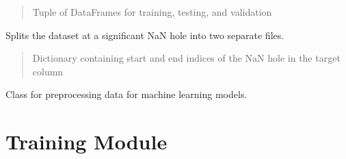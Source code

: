 \documentclass[letterpaper,10pt,english]{sphinxmanual}
\begin{document}
\begin{fulllineitems}
\begin{fulllineitems}
\begin{quote}
\begin{description}
\sphinxAtStartPar
Tuple of DataFrames for training, testing, and validation

\end{description}\end{quote}

\end{fulllineitems}


\begin{fulllineitems}
\label{\detokenize{docs/data_preprocessing:data_preprocessing.DataPreprocessor.split_file_at_nanhole}}
\pysigstartsignatures
{}
\pysigstopsignatures
\sphinxAtStartPar
Splits the dataset at a significant NaN hole into two separate files.
\begin{quote}\begin{description}
\sphinxAtStartPar
{} \textendash{} Dictionary containing start and end indices of the NaN hole in the target column

\end{description}\end{quote}

\end{fulllineitems}


\end{fulllineitems}


\sphinxAtStartPar
Class for preprocessing data for machine learning models.

\sphinxstepscope


\section{Training Module}
\label{\detokenize{docs/training_module:module-training_module}}\label{\detokenize{docs/training_module:training-module}}\label{\detokenize{docs/training_module::doc}}
\end{document}
